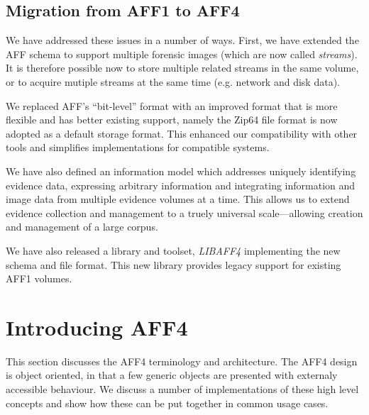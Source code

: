 \documentclass[10pt, conference]{IEEEtran}
\begin{document}
\subsection{Migration from AFF1 to AFF4}
We have addressed these issues in a number of ways. First, we have
extended the AFF schema to support multiple forensic images (which are
now called \emph{streams}). It is therefore possible now to store
multiple related streams in the same volume, or to acquire mutiple
streams at the same time (e.g. network and disk data).

We replaced AFF's ``bit-level'' format with an improved format that is
more flexible and has better existing support, namely the Zip64 file
format is now adopted as a default storage format. This enhanced our
compatibility with other tools and simplifies implementations for
compatible systems.

We have also defined an information model which addresses uniquely
identifying evidence data, expressing arbitrary information and
integrating information and image data from multiple evidence volumes
at a time. This allows us to extend evidence collection and management
to a truely universal scale---allowing creation and management of a
large corpus.

We have also released a library and toolset, \emph{LIBAFF4}
implementing the new schema and file format. This new library provides
legacy support for existing AFF1 volumes.

\section{Introducing AFF4}

This section discusses the AFF4 terminology and architecture. The AFF4
design is object oriented, in that a few generic objects are presented
with externaly accessible behaviour. We discuss a number of
implementations of these high level concepts and show how these can be
put together in common usage cases.
\end{document}
